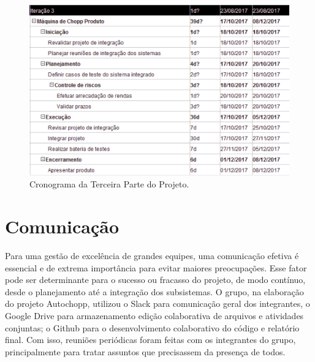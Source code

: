 			\begin{figure}[H]
				\centering
				\includegraphics[scale= 0.7]{figuras/cronograma3.png}
				\caption{Cronograma da Terceira Parte do Projeto.}
				\label{cronograma3}
			\end{figure}

	\section[Comunicação]{Comunicação}

		Para uma gestão de excelência de grandes equipes, uma comunicação efetiva é essencial e de extrema importância 
		para evitar maiores preocupações. Esse fator pode ser determinante para o sucesso ou fracasso do projeto, de 
		modo contínuo, desde o planejamento até a integração dos subsistemas. O grupo, na elaboração do projeto 
		Autochopp, utilizou o Slack para comunicação geral dos integrantes, o Google Drive para armazenamento edição 
		colaborativa de arquivos e atividades conjuntas; o Github para o desenvolvimento colaborativo do código e 
		relatório final. Com isso, reuniões periódicas foram feitas com os integrantes do grupo, principalmente para 
		tratar assuntos que precisassem da presença de todos.

